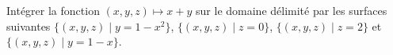 
\begin{exercice}\label{exoIntMult0012}

Intégrer la fonction $(x,y,z) \mapsto x+y$ sur le domaine 
délimité par les surfaces suivantes $\{(x,y,z) \mid y=1-x^2 \}$, 
$\{(x,y,z) \mid z=0 \}$, $\{(x,y,z) \mid z=2 \}$ et $\{(x,y,z) \mid y=1-x 
\}$.

\end{exercice}
